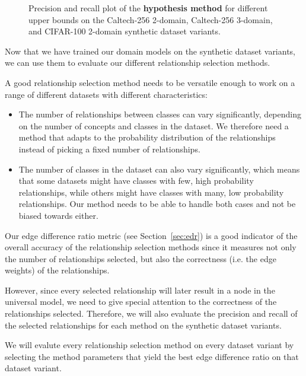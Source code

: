 \begin{figure}[ht]
      \centering
      \scalebox{0.35}{}
      \caption{Precision and recall plot of the \textbf{hypothesis method}
            for different upper bounds on the Caltech-256 2-domain, Caltech-256 3-domain, and CIFAR-100 2-domain synthetic dataset variants.}
      \label{fig:hypothesis_method_precision_recall}
\end{figure}



Now that we have trained our domain models on the synthetic dataset variants,
we can use them to evaluate our different relationship selection methods.

A good relationship selection method needs to be versatile enough
to work on a range of different datasets with different characteristics:
\begin{itemize}
      \item The number of relationships between classes can vary significantly,
            depending on the number of concepts and classes in the dataset.
            We therefore need a method that adapts to the probability distribution of the relationships
            instead of picking a fixed number of relationships.
      \item The number of classes in the dataset can also vary significantly,
            which means that some datasets might have classes with few, high probability relationships,
            while others might have classes with many, low probability relationships.
            Our method needs to be able to handle both cases
            and not be biased towards either.
\end{itemize}

Our edge difference ratio metric (see Section~\ref{sec:edr})
is a good indicator of the overall accuracy of the relationship selection methods
since it measures not only the number of relationships selected,
but also the correctness (i.e. the edge weights) of the relationships.

However, since every selected relationship will later result
in a node in the universal model,
we need to give special attention to the correctness of the relationships selected.
Therefore, we will also evaluate the precision and recall of the selected relationships
for each method on the synthetic dataset variants.

We will evalute every relationship selection method on every dataset variant
by selecting the method parameters that yield the best edge difference ratio
on that dataset variant.

